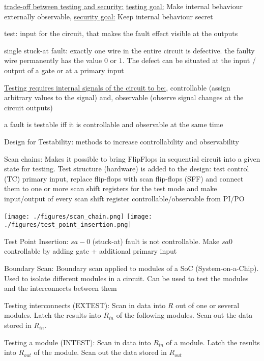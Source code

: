 \documentclass[landscape, a4paper]{article}
\begin{document}
\begin{minipage}[t]{0.2\linewidth}
\begin{betterlist}
		\item \underline{trade-off between testing and security:} \underline{testing goal:} Make internal behaviour externally observable, \underline{security goal:} Keep internal behaviour secret
		\item \alert{test:} input for the circuit, that makes the fault effect visible at the outputs
		\item \alert{single stuck-at fault:} exactly one wire in the entire circuit is defective. the faulty wire permanently has the value $0$ or $1$. The defect can be situated at the input / output of a gate or at a primary input
		\item \underline{Testing requires internal signals of the circuit to be:}, \alert{controllable} (assign arbitrary values to the signal) and, \alert{observable} (observe signal changes at the circuit outputs)
		\item a fault is \alert{testable} iff it is controllable and observable at the same time
		\item \alert{Design for Testability:} methods to increase controllability and observability
		\item \alert{Scan chains:} Makes it possible to bring FlipFlops in sequential circuit into a given state for testing. Test structure (hardware) is added to the design: test control (TC) primary input, replace flip-flops with scan flip-flops (SFF) and connect them to one or more scan shift registers for the test mode and make input/output of every scan shift register controllable/observable from PI/PO

		\texttt{[image: ./figures/scan\_chain.png]}
		\texttt{[image: ./figures/test\_point\_insertion.png]}
		\item \alert{Test Point Insertion:} $sa-0$ (stuck-at) fault is not controllable. Make $sa0$ controllable by adding gate + additional primary
		input
		\item \alert{Boundary Scan:} Boundary scan applied to modules of a SoC (System-on-a-Chip). Used to isolate different modules in a circuit. Can be used to test the modules and the interconnects between them
		\begin{betterlist}
			\item Testing interconnects (EXTEST): Scan in data into $R$ out of one or several modules. Latch the results into $R_{in}$ of the following modules. Scan out the data stored in $R_{in}$.
			\item Testing a module (INTEST): Scan in data into $R_{in}$ of a module. Latch the results into $R_{out}$ of the module. Scan out the data stored in $R_{out}$
		\end{betterlist}


\end{betterlist}
\end{minipage}
\end{document}
